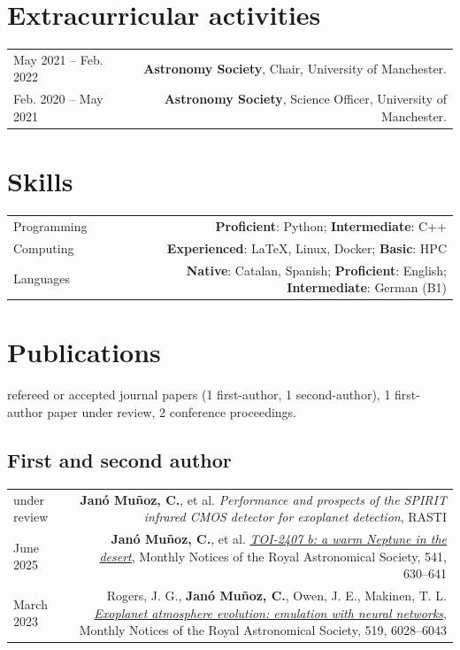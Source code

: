 \documentclass{article}
\newcommand{\me}{\textbf{Janó Muñoz, C.}}
\begin{document}
\section*{Extracurricular activities}
\begin{tabular}{L!{\vrule}R}
  May 2021 -- Feb. 2022 & \textbf{Astronomy Society}, Chair, University of Manchester. \\
  Feb. 2020 -- May 2021 & \textbf{Astronomy Society}, Science Officer, University of Manchester. \\
\end{tabular}

\section*{Skills}
\begin{tabular}{L!{\vrule}R}
	Programming & \textbf{Proficient}: Python; \textbf{Intermediate}: C++\\
	Computing & \textbf{Experienced}: LaTeX, Linux, Docker; \textbf{Basic}: HPC \\
	Languages & \textbf{Native}: Catalan, Spanish; \textbf{Proficient}: English; \textbf{Intermediate}: German (B1)
\end{tabular}

\section*{Publications}
 refereed or accepted journal papers (1 first-author, 1 second-author), 1 first-author paper under review, 2 conference proceedings. %

\subsection*{First and second author}
\begin{tabular}{L!{\vrule}R}
    under review &
    \me, et al.
    {\textit{Performance and prospects of the SPIRIT infrared CMOS detector for exoplanet detection}}, RASTI \\ 

    June 2025 &
    \me, et al.
    \href{https://ui.adsabs.harvard.edu/abs/2025MNRAS.541..630J/abstract}{\textit{TOI-2407 b: a warm Neptune in the desert}},
    Monthly Notices of the Royal Astronomical Society, 541, 630--641 \\

    March 2023 &
    Rogers, J. G., \me, Owen, J. E., Makinen, T. L.
    \href{https://ui.adsabs.harvard.edu/abs/2023MNRAS.519.6028R/abstract}{\textit{Exoplanet atmosphere evolution: emulation with neural networks}},
    Monthly Notices of the Royal Astronomical Society, 519, 6028--6043 \\
\end{tabular}
\end{document}
